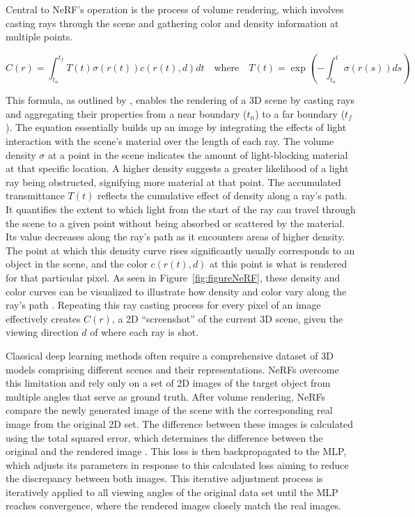 Central to NeRF's operation is the process of volume rendering, which involves casting rays through the scene and gathering color and density information at multiple points.

\[ 
C(r) = \int_{t_n}^{t_f} T(t)\sigma(r(t))c(r(t), d)dt \quad \text{where} \quad T(t) = \exp\left(-\int_{t_n}^t \sigma(r(s))ds\right) 
\]

This formula, as outlined by \citeauthor{mildenhallNERF}, enables the rendering of a 3D scene by casting rays and aggregating their properties from a near boundary (\(t_n\)) to a far boundary (\(t_f\)). The equation essentially builds up an image by integrating the effects of light interaction with the scene's material over the length of each ray. The volume density \(\sigma\) at a point in the scene indicates the amount of light-blocking material at that specific location. A higher density suggests a greater likelihood of a light ray being obstructed, signifying more material at that point. The accumulated transmittance \( T(t) \) reflects the cumulative effect of density along a ray's path. It quantifies the extent to which light from the start of the ray can travel through the scene to a given point without being absorbed or scattered by the material. Its value decreases along the ray's path as it encounters areas of higher density. The point at which this density curve rises significantly usually corresponds to an object in the scene, and the color \( c(r(t), d) \) at this point is what is rendered for that particular pixel. As seen in Figure~\ref{fig:figureNeRF}, these density and color curves can be visualized to illustrate how density and color vary along the ray's path \citep{mildenhallNERF}. Repeating this ray casting process for every pixel of an image effectively creates \(C(r)\), a 2D ``screenshot'' of the current 3D scene, given the viewing direction \( d \) of where each ray is shot. 

Classical deep learning methods often require a comprehensive dataset of 3D models comprising different scenes and their representations. NeRFs overcome this limitation and rely only on a set of 2D images of the target object from multiple angles that serve as ground truth. After volume rendering, NeRFs compare the newly generated image of the scene with the corresponding real image from the original 2D set. The difference between these images is calculated using the total squared error, which determines the difference between the original and the rendered image \citep{mildenhallNERF}. This loss is then backpropagated to the MLP, which adjusts its parameters in response to this calculated loss aiming to reduce the discrepancy between both images. This iterative adjustment process is iteratively applied to all viewing angles of the original data set until the MLP reaches convergence, where the rendered images closely match the real images.

